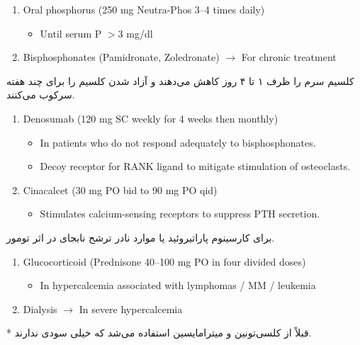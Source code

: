 \documentclass[a4paper,12pt]{article}
\begin{document}
\begin{latin}
\begin{enumerate}[label=\arabic*.,start=5]
\item Oral phosphorus (250 mg Neutra-Phos 3--4 times daily)
\begin{itemize}
\item Until serum P $>3$ mg/dl
\end{itemize}
\item Bisphosphonates (Pamidronate, Zoledronate) $\longrightarrow$ For chronic treatment
\end{enumerate}
\end{latin}
کلسیم سرم را ظرف ۱ تا ۴ روز کاهش می‌دهند و آزاد شدن کلسیم را برای چند هفته سرکوب می‌کنند.
\begin{latin}
\begin{enumerate}[label=\arabic*.,start=7]
\item Denosumab (120 mg SC weekly for 4 weeks then monthly)
\begin{itemize}
\item In patients who do not respond adequately to bisphosphonates.
\item Decoy receptor for RANK ligand to mitigate stimulation of osteoclasts.
\end{itemize}
\item Cinacalcet (30 mg PO bid to 90 mg PO qid)
\begin{itemize}
\item Stimulates calcium-sensing receptors to suppress PTH secretion.
\end{itemize}
\end{enumerate}
\end{latin}
برای کارسینوم پاراتیروئید یا موارد نادر ترشح نابجای  در اثر تومور.
\begin{latin}
\begin{enumerate}[label=\arabic*.,start=9]
\item Glucocorticoid (Prednisone 40--100 mg PO in four divided doses)
\begin{itemize}
\item In hypercalcemia associated with lymphomas / MM / leukemia
\end{itemize}
\item Dialysis $\longrightarrow$ In severe hypercalcemia
\end{enumerate}
\end{latin}
* قبلاً از کلسی‌تونین و میترامایسین استفاده می‌شد که خیلی سودی ندارند.
\end{document}

